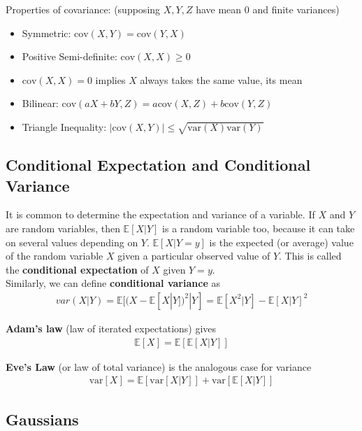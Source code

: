 \documentclass{harvardml}
\theoremstyle{definition}
\theoremstyle{plain}
\newcommand{\E}{\mathbb{E}}
\newcommand{\var}{\text{var}}
\newcommand{\cov}{\text{cov}}
\begin{document}
		\noindent Properties of covariance: (supposing $X,Y,Z$ have mean 0 
                  and finite variances)
		\begin{itemize}
            \item Symmetric: $\cov(X,Y) = \cov(Y,X)$
            \item Positive Semi-definite: $\cov(X,X) \geq 0$
            \item $\cov(X,X) = 0$ implies $X$ always takes the same value, 
				  its mean
            \item Bilinear: $\cov(aX + bY,Z) = a\cov(X,Z) + b\cov(Y,Z)$
            \item Triangle Inequality: $|\cov(X,Y)| \leq \sqrt{\var(X)\var(Y)}$
		\end{itemize}

	\subsection{Conditional Expectation and Conditional Variance}
		It is common to determine the expectation and variance of a variable. 
		If $X$ and $Y$ are random variables, then $\E[X|Y]$ is a random 
		variable too, because it can take on several values depending on $Y$. 
		$\E[X|Y=y]$ is the expected (or average) value of the random variable 
		$X$ given a particular observed value of $Y$. This is called the 
		\textbf{conditional expectation} of $X$ given $Y=y$.\\
	
		\noindent Similarly, we can define \textbf{conditional variance} as
		\begin{align*}
            var(X|Y) = \E[(X - \E[X|Y])^2 | Y] = \E[X^2|Y] - \E[X|Y]^2
		\end{align*}
		
		\noindent \textbf{Adam's law} (law of iterated expectations) gives
		\begin{align*}
			\E[X]=\E[\E[X|Y]]
		\end{align*}

		\noindent \textbf{Eve's Law} (or law of total variance) is the 
		analogous case for variance
		\begin{align*}
  			\var[X] = \E[ \var[X|Y] ] + \var[ \E[X | Y] ]
		\end{align*}



	\subsection{Gaussians}
\end{document}
